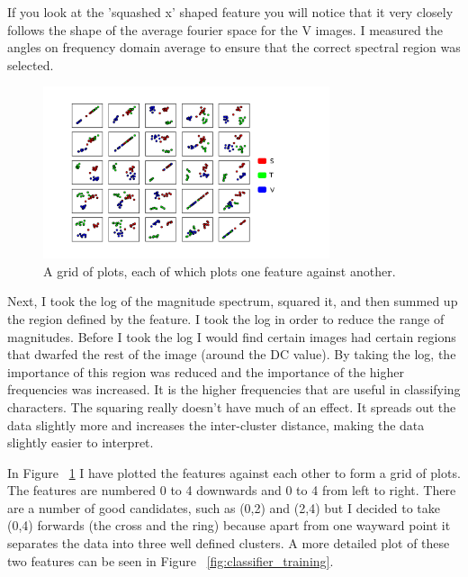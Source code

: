 \documentclass[11pt, a4paper]{article}
\begin{document}
If you look at the 'squashed x' shaped feature you will notice that it very closely follows the shape of the average fourier space for the V images. I measured the angles on frequency domain average to ensure that the correct spectral region was selected.
\begin{figure}[ht]
	\centering
	\includegraphics[trim={0 1.5cm 3cm 1.5cm},clip,width=0.75\textwidth]{feature_matrix_leg.png}
	\caption{A grid of plots, each of which plots one feature against another.}
	\label{fig:feature_matrix}
\end{figure}

Next, I took the log of the magnitude spectrum, squared it, and then summed up the region defined by the feature. I took the log in order to reduce the range of magnitudes. Before I took the log I would find certain images had certain regions that dwarfed the rest of the image (around the DC value). By taking the log, the importance of this region was reduced and the importance of the higher frequencies was increased. It is the higher frequencies that are useful in classifying characters. The squaring really doesn't have much of an effect. It spreads out the data slightly more and increases the inter-cluster distance, making the data slightly easier to interpret.

In Figure ~\ref{fig:feature_matrix} I have plotted the features against each other to form a grid of plots. The features are numbered 0 to 4 downwards and 0 to 4 from left to right. There are a number of good candidates, such as (0,2) and (2,4) but I decided to take (0,4) forwards (the cross and the ring) because apart from one wayward point it separates the data into three well defined clusters. A more detailed plot of these two features can be seen in Figure ~\ref{fig:classifier_training}.



\end{document}
